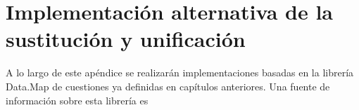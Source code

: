 \appendix

\chapter{Implementación alternativa de la sustitución y unificación} \label{aped.A}

A lo largo de este apéndice se realizarán implementaciones basadas en la
librería Data.Map de cuestiones ya definidas en capítulos anteriores. Una
fuente de información sobre esta librería es \cite{map}



